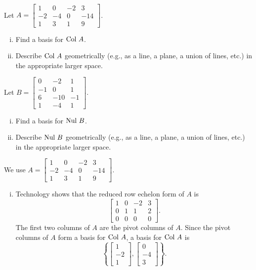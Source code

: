 \begin{example} ~
\ba
\item Let $A = \left[ \begin{array}{rrrr} 1&0&-2&3 \\ -2&-4&0&-14 \\ 1&3&1&9 \end{array} \right]$.
	\begin{enumerate}[i.]
	\item Find a basis for $\text{Col } A$. 
	
	\item  Describe $\text{Col } A$ geometrically (e.g., as a line, a plane, a union of lines, etc.) in the appropriate larger space. 
	
	\end{enumerate}
	
\item Let $B = \left[ \begin{array}{rrr} 0&-2&1\\-1&0&1 \\ 6&-10&-1 \\ 1&-4&1  \end{array} \right]$.
	\begin{enumerate}[i.]
	\item Find a basis for $\text{Nul } B$. 
	
	\item  Describe $\text{Nul } B$ geometrically (e.g., as a line, a plane, a union of lines, etc.) in the appropriate larger space. 
	
	\end{enumerate}
	
\ea
	
\ExampleSolution
\ba
\item We use $A = \left[ \begin{array}{rrrr} 1&0&-2&3 \\ -2&-4&0&-14 \\ 1&3&1&9 \end{array} \right]$.
	\begin{enumerate}[i.]
	\item Technology shows that the reduced row echelon form of $A$ is 
	\[\left[ \begin {array}{ccrc} 1&0&-2&3\\ 0&1&1&2 \\ 0&0&0&0\end {array} \right].\]
	The first two columns of $A$ are the pivot columns of $A$. Since the pivot columns of $A$ form a basis for $\text{Col } A$, a basis for $\text{Col } A$ is 
	\[\left\{ \left[ \begin {array}{r} 1\\ -2 \\ 1\end {array} \right], \left[ \begin {array}{r} 0\\ -4 \\ 3\end {array} \right] \right\}.\]


\end{enumerate}
\end{example}
